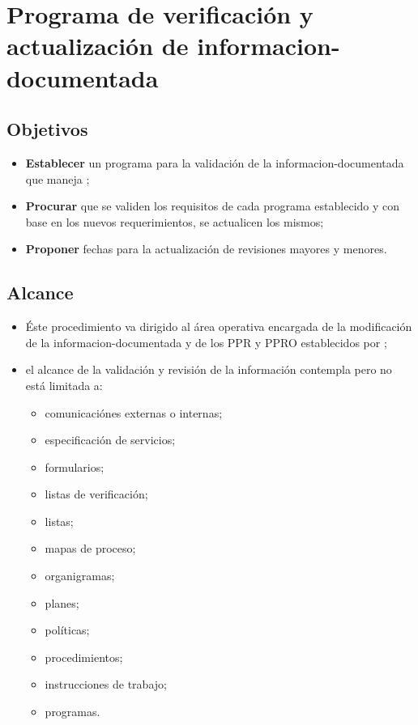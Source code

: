 \renewcommand{\MayorVer}{1}
\renewcommand{\MenorVer}{0}
\renewcommand{\Codigo}{G-1-PRO}
\renewcommand{\FechaPub}{2023--01}
\renewcommand{\Titulo}{Programa de verificación y actualización de \gls{informacion-documentada}}

\section{\Titulo}
\label{informacion.actualizacion}

\subsection{Objetivos}
\begin{itemize}
    \item \textbf{Establecer} un programa para la validación de la \gls{informacion-documentada} que maneja ;
    \item \textbf{Procurar} que se validen los requisitos de cada programa establecido y con base en los nuevos requerimientos, se actualicen los mismos;
    \item \textbf{Proponer} fechas para la actualización de revisiones mayores y menores.
\end{itemize}

\subsection{Alcance}
\begin{itemize}
    \item Éste procedimiento va dirigido al área operativa encargada de la modificación de la \gls{informacion-documentada} y de los \gls{PPR} y \gls{PPRO} establecidos por ;
    \item el alcance de la validación y revisión de la información contempla pero no está limitada a:
          \begin{itemize}
              \item comunicaciónes externas o internas;
              \item especificación de servicios;
              \item formularios;
              \item listas de verificación;
              \item listas;
              \item mapas de proceso;
              \item organigramas;
              \item planes;
              \item políticas;
              \item procedimientos;
              \item instrucciones de trabajo;
              \item programas.
          \end{itemize}
\end{itemize}

